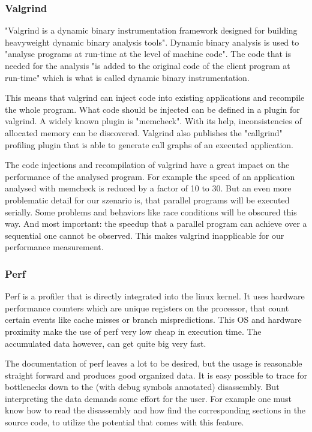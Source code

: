 \subsubsection{Valgrind}
"Valgrind is a dynamic binary instrumentation framework designed for building heavyweight dynamic binary analysis tools"\cite{nethercote2007valgrind}. Dynamic binary analysis is used to "analyse programs at run-time at the level of machine code". The code that is needed for the analysis "is added to the original code of the client program at run-time" which is what is called dynamic binary instrumentation.

This means that valgrind can inject code into existing applications and recompile the whole program. What code should be injected can be defined in a plugin for valgrind. A widely known plugin is "memcheck". With its help, inconsistencies of allocated memory can be discovered. Valgrind also publishes the "callgrind" profiling plugin that is able to generate call graphs of an executed application.

The code injections and recompilation of valgrind have a great impact on the performance of the analysed program. For example the speed of an application analysed with memcheck is reduced by a factor of 10 to 30\cite{valgrindTools}. But an even more problematic detail for our szenario is, that parallel programs will be executed serially. Some problems and behaviors like race conditions will be obscured this way. And most important: the speedup that a parallel program can achieve over a sequential one cannot be observed. This makes valgrind inapplicable for our performance measurement.

\subsubsection{Perf}
Perf is a profiler that is directly integrated into the linux kernel. It uses hardware performance counters which are unique registers on the processor, that count certain events like cache misses or branch mispredictions. This OS and hardware proximity make the use of perf very low cheap in execution time. The accumulated data however, can get quite big very fast.

The documentation of perf leaves a lot to be desired, but the usage is reasonable straight forward and produces good organized data. It is easy possible to trace for bottlenecks down to the (with debug symbols annotated) disassembly. But interpreting the data demands some effort for the user. For example one must know how to read the disassembly and how find the corresponding sections in the source code, to utilize the potential that comes with this feature.

